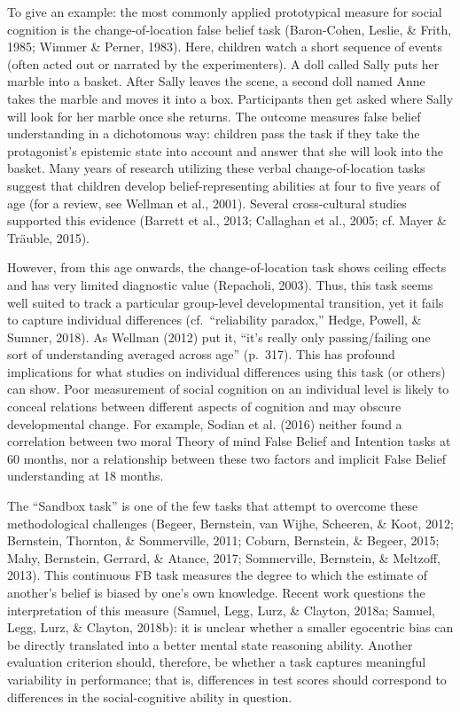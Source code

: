 \documentclass[
  man,floatsintext]{apa7}
\begin{document}
To give an example: the most commonly applied prototypical measure for social cognition is the change-of-location false belief task (Baron-Cohen, Leslie, \& Frith, 1985; Wimmer \& Perner, 1983).
Here, children watch a short sequence of events (often acted out or narrated by the experimenters).
A doll called Sally puts her marble into a basket.
After Sally leaves the scene, a second doll named Anne takes the marble and moves it into a box.
Participants then get asked where Sally will look for her marble once she returns.
The outcome measures false belief understanding in a dichotomous way: children pass the task if they take the protagonist's epistemic state into account and answer that she will look into the basket.
Many years of research utilizing these verbal change-of-location tasks suggest that children develop belief-representing abilities at four to five years of age (for a review, see Wellman et al., 2001).
Several cross-cultural studies supported this evidence (Barrett et al., 2013; Callaghan et al., 2005; cf. Mayer \& Träuble, 2015).

However, from this age onwards, the change-of-location task shows ceiling effects and has very limited diagnostic value (Repacholi, 2003).
Thus, this task seems well suited to track a particular group-level developmental transition, yet it fails to capture individual differences (cf.~``reliability paradox,'' Hedge, Powell, \& Sumner, 2018).
As Wellman (2012) put it, ``it's really only passing/failing one sort of understanding averaged across age'' (p.~317).
This has profound implications for what studies on individual differences using this task (or others) can show.
Poor measurement of social cognition on an individual level is likely to conceal relations between different aspects of cognition and may obscure developmental change.
For example, Sodian et al. (2016) neither found a correlation between two moral Theory of mind False Belief and Intention tasks at 60 months, nor a relationship between these two factors and implicit False Belief understanding at 18 months.

The ``Sandbox task'' is one of the few tasks that attempt to overcome these methodological challenges (Begeer, Bernstein, van Wijhe, Scheeren, \& Koot, 2012; Bernstein, Thornton, \& Sommerville, 2011; Coburn, Bernstein, \& Begeer, 2015; Mahy, Bernstein, Gerrard, \& Atance, 2017; Sommerville, Bernstein, \& Meltzoff, 2013).
This continuous FB task measures the degree to which the estimate of another's belief is biased by one's own knowledge.
Recent work questions the interpretation of this measure (Samuel, Legg, Lurz, \& Clayton, 2018a; Samuel, Legg, Lurz, \& Clayton, 2018b): it is unclear whether a smaller egocentric bias can be directly translated into a better mental state reasoning ability.
Another evaluation criterion should, therefore, be whether a task captures meaningful variability in performance; that is, differences in test scores should correspond to differences in the social-cognitive ability in question.
\end{document}
